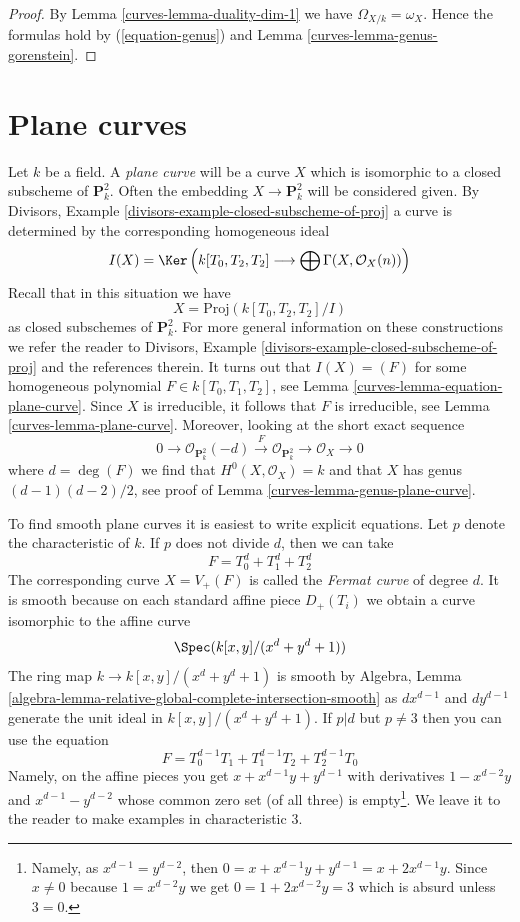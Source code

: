 \begin{proof}

By Lemma \ref{curves-lemma-duality-dim-1} we have $\Omega_{X/k} = \omega_X$.
Hence the formulas hold by (\ref{equation-genus}) and
Lemma \ref{curves-lemma-genus-gorenstein}.
\end{proof}

\section{Plane curves}
\label{curves-section-plane-curves}
Let $k$ be a field. A {\it plane curve} will be a curve $X$ which is isomorphic
to a closed subscheme of $\mathbf{P}^2_k$. Often the embedding
$X \to \mathbf{P}^2_k$ will be considered given. By
Divisors, Example \ref{divisors-example-closed-subscheme-of-proj}
a curve is determined by the corresponding homogeneous ideal
$$
I(X) =
\Ker\left(
k[T_0, T_2, T_2] \longrightarrow \bigoplus \Gamma(X, \mathcal{O}_X(n))
\right)
$$
Recall that in this situation we have
$$
X = \text{Proj}(k[T_0, T_2, T_2]/I)
$$
as closed subschemes of $\mathbf{P}^2_k$.
For more general information on these constructions we refer the
reader to Divisors, Example \ref{divisors-example-closed-subscheme-of-proj}
and the references therein.
It turns out that $I(X) = (F)$ for some homogeneous polynomial
$F \in k[T_0, T_1, T_2]$, see Lemma \ref{curves-lemma-equation-plane-curve}.
Since $X$ is irreducible, it follows that $F$ is irreducible, see
Lemma \ref{curves-lemma-plane-curve}. Moreover, looking at the short exact
sequence
$$
0 \to \mathcal{O}_{\mathbf{P}^2_k}(-d) \xrightarrow{F}
\mathcal{O}_{\mathbf{P}^2_k} \to \mathcal{O}_X \to 0
$$
where $d = \deg(F)$ we find that $H^0(X, \mathcal{O}_X) = k$ and that $X$
has genus $(d - 1)(d - 2)/2$, see proof of Lemma \ref{curves-lemma-genus-plane-curve}.

\medskip\noindent
To find smooth plane curves it is easiest to write explicit
equations. Let $p$ denote the characteristic of $k$. If $p$
does not divide $d$, then we can take
$$
F = T_0^d + T_1^d + T_2^d
$$
The corresponding curve $X = V_+(F)$ is called the
{\it Fermat curve} of degree $d$. It is smooth because
on each standard affine piece $D_+(T_i)$ we obtain
a curve isomorphic to the affine curve
$$
\Spec(k[x, y]/(x^d + y^d + 1))
$$
The ring map $k \to k[x, y]/(x^d + y^d + 1)$ is smooth by
Algebra, Lemma \ref{algebra-lemma-relative-global-complete-intersection-smooth}
as $d x^{d - 1}$ and $d y^{d - 1}$ generate the unit ideal
in $k[x, y]/(x^d + y^d + 1)$. If $p | d$ but $p \not = 3$
then you can use the equation
$$
F = T_0^{d - 1}T_1 + T_1^{d - 1}T_2 + T_2^{d - 1}T_0
$$
Namely, on the affine pieces you get $x + x^{d - 1}y + y^{d - 1}$
with derivatives $1 - x^{d - 2}y$ and $x^{d - 1} - y^{d - 2}$
whose common zero set (of all three) is empty\footnote{Namely,
as $x^{d - 1} = y^{d - 2}$, then $0 = x + x^{d - 1}y + y^{d - 1} =
x + 2 x^{d - 1} y$. Since $x \not = 0$ because $1 = x^{d - 2}y$
we get $0 = 1 + 2x^{d - 2}y = 3$ which is absurd unless $3 = 0$.}.
We leave it to the reader to make examples in characteristic $3$.

